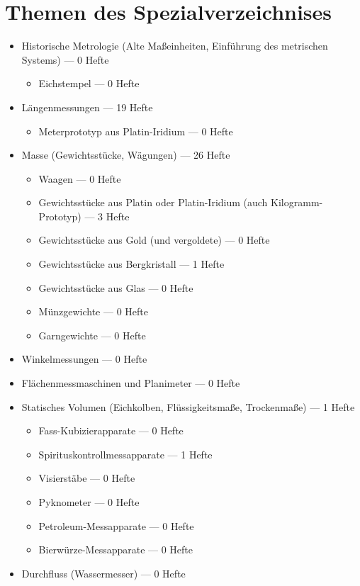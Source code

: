 \chapter{Themen des Spezialverzeichnises}
\begin{itemize}
\item Historische Metrologie (Alte Maßeinheiten, Einführung des metrischen Systems) --- 0 Hefte
\begin{itemize}
\item Eichstempel --- 0 Hefte
\end{itemize}
\item Längenmessungen --- 19 Hefte
\begin{itemize}
\item Meterprototyp aus Platin-Iridium --- 0 Hefte
\end{itemize}
\item Masse (Gewichtsstücke, Wägungen) --- 26 Hefte
\begin{itemize}
\item Waagen --- 0 Hefte
\item Gewichtsstücke aus Platin oder Platin-Iridium (auch Kilogramm-Prototyp) --- 3 Hefte
\item Gewichtsstücke aus Gold (und vergoldete) --- 0 Hefte
\item Gewichtsstücke aus Bergkristall --- 1 Hefte
\item Gewichtsstücke aus Glas --- 0 Hefte
\item Münzgewichte --- 0 Hefte
\item Garngewichte --- 0 Hefte
\end{itemize}
\item Winkelmessungen --- 0 Hefte
\item Flächenmessmaschinen und Planimeter --- 0 Hefte
\item Statisches Volumen (Eichkolben, Flüssigkeitsmaße, Trockenmaße) --- 1 Hefte
\begin{itemize}
\item Fass-Kubizierapparate --- 0 Hefte
\item Spirituskontrollmessapparate --- 1 Hefte
\item Visierstäbe --- 0 Hefte
\item Pyknometer --- 0 Hefte
\item Petroleum-Messapparate --- 0 Hefte
\item Bierwürze-Messapparate --- 0 Hefte
\end{itemize}
\item Durchfluss (Wassermesser) --- 0 Hefte

\end{itemize}
